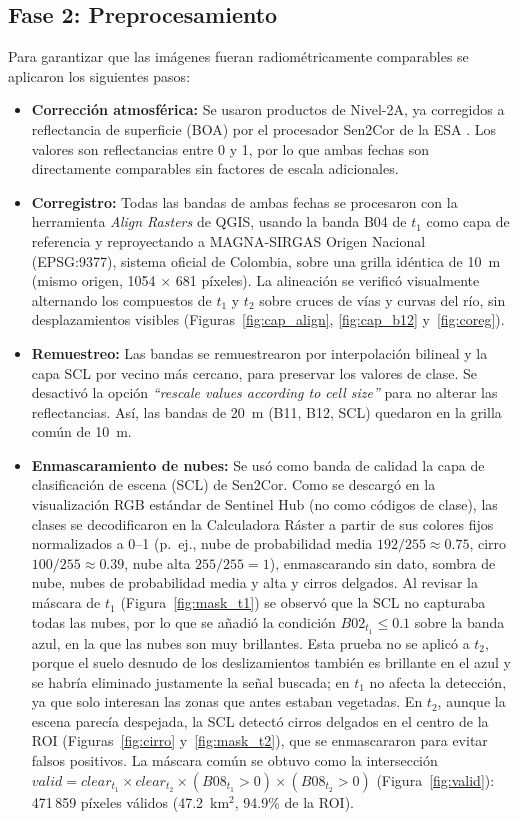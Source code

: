 \documentclass[12pt]{article}
\begin{document}
\subsection{Fase 2: Preprocesamiento}
Para garantizar que las imágenes fueran radiométricamente comparables se aplicaron los siguientes pasos:
\begin{itemize}
    \item \textbf{Corrección atmosférica:} Se usaron productos de Nivel-2A, ya corregidos a reflectancia de superficie (BOA) por el procesador Sen2Cor de la ESA \parencite{Main-Knorn2017}. Los valores son reflectancias entre 0 y 1, por lo que ambas fechas son directamente comparables sin factores de escala adicionales.
    \item \textbf{Corregistro:} Todas las bandas de ambas fechas se procesaron con la herramienta \emph{Align Rasters} de QGIS, usando la banda B04 de $t_1$ como capa de referencia y reproyectando a MAGNA-SIRGAS Origen Nacional (EPSG:9377), sistema oficial de Colombia, sobre una grilla idéntica de 10~m (mismo origen, 1054 $\times$ 681 píxeles). La alineación se verificó visualmente alternando los compuestos de $t_1$ y $t_2$ sobre cruces de vías y curvas del río, sin desplazamientos visibles (Figuras~\ref{fig:cap_align}, \ref{fig:cap_b12} y~\ref{fig:coreg}).
    \item \textbf{Remuestreo:} Las bandas se remuestrearon por interpolación bilineal y la capa SCL por vecino más cercano, para preservar los valores de clase. Se desactivó la opción \emph{``rescale values according to cell size''} para no alterar las reflectancias. Así, las bandas de 20~m (B11, B12, SCL) quedaron en la grilla común de 10~m.
    \item \textbf{Enmascaramiento de nubes:} Se usó como banda de calidad la capa de clasificación de escena (SCL) de Sen2Cor. Como se descargó en la visualización RGB estándar de Sentinel Hub (no como códigos de clase), las clases se decodificaron en la Calculadora Ráster a partir de sus colores fijos normalizados a 0--1 (p.~ej., nube de probabilidad media $192/255 \approx 0.75$, cirro $100/255 \approx 0.39$, nube alta $255/255 = 1$), enmascarando sin dato, sombra de nube, nubes de probabilidad media y alta y cirros delgados. Al revisar la máscara de $t_1$ (Figura~\ref{fig:mask_t1}) se observó que la SCL no capturaba todas las nubes, por lo que se añadió la condición $B02_{t_1} \leq 0.1$ sobre la banda azul, en la que las nubes son muy brillantes. Esta prueba no se aplicó a $t_2$, porque el suelo desnudo de los deslizamientos también es brillante en el azul y se habría eliminado justamente la señal buscada; en $t_1$ no afecta la detección, ya que solo interesan las zonas que antes estaban vegetadas. En $t_2$, aunque la escena parecía despejada, la SCL detectó cirros delgados en el centro de la ROI (Figuras~\ref{fig:cirro} y~\ref{fig:mask_t2}), que se enmascararon para evitar falsos positivos. La máscara común se obtuvo como la intersección $valid = clear_{t_1} \times clear_{t_2} \times (B08_{t_1} > 0) \times (B08_{t_2} > 0)$ (Figura~\ref{fig:valid}): 471\,859 píxeles válidos (47.2~km$^2$, 94.9\% de la ROI).
\end{itemize}
\end{document}
